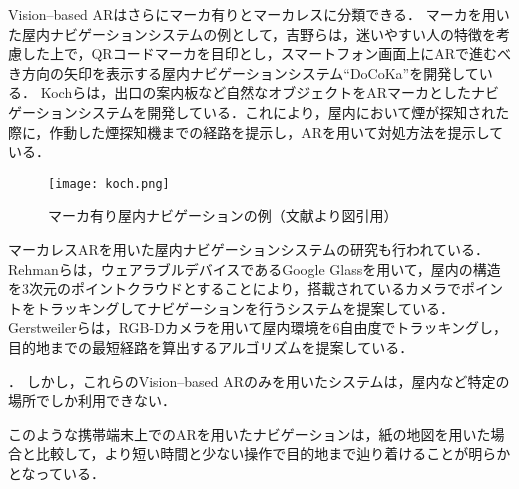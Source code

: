     Vision--based ARはさらにマーカ有りとマーカレスに分類できる．
    マーカを用いた屋内ナビゲーションシステムの例として，吉野らは，迷いやすい人の特徴を考慮した上で，QRコードマーカを目印とし，スマートフォン画面上にARで進むべき方向の矢印を表示する屋内ナビゲーションシステム``DoCoKa''を開発している\cite{Yoshino:2013}．
    Kochらは，出口の案内板など自然なオブジェクトをARマーカとしたナビゲーションシステムを開発している\cite{Koch:2014}．これにより，屋内において煙が探知された際に，作動した煙探知機までの経路を提示し，ARを用いて対処方法を提示している．
    \begin{figure}[tb]
      \centerline{\texttt{[image: koch.png]}}
      \caption{マーカ有り屋内ナビゲーションの例（文献\cite{Koch:2014}より図引用）}
      \label{figure:koch}
    \end{figure}

    マーカレスARを用いた屋内ナビゲーションシステムの研究も行われている．
    Rehmanらは，ウェアラブルデバイスであるGoogle Glassを用いて，屋内の構造を3次元のポイントクラウドとすることにより，搭載されているカメラでポイントをトラッキングしてナビゲーションを行うシステムを提案している\cite{Rehman:2015}．
    Gerstweilerらは，RGB-Dカメラを用いて屋内環境を6自由度でトラッキングし，目的地までの最短経路を算出するアルゴリズムを提案している\cite{Gerstweiler:2018}．
    
    \cite{Iwanaji:2016}．
    しかし，これらのVision--based ARのみを用いたシステムは，屋内など特定の場所でしか利用できない．
    
    このような携帯端末上でのARを用いたナビゲーションは，紙の地図を用いた場合と比較して，より短い時間と少ない操作で目的地まで辿り着けることが明らかとなっている\cite{Rehman:2017, Yoshino:2013}．
    

